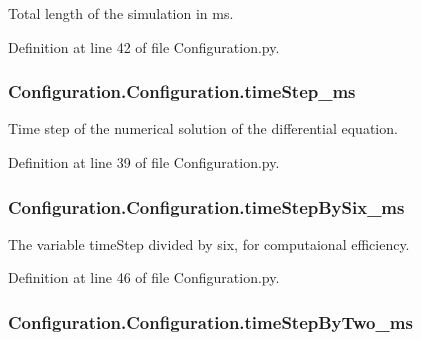 Total length of the simulation in ms. 



Definition at line 42 of file Configuration.\-py.

\hypertarget{class_configuration_1_1_configuration_a6379aaa6e54523ca81e3713d1846679b}{
\subsubsection[{time\-Step\-\_\-ms}]{\setlength{\rightskip}{0pt plus 5cm}Configuration.\-Configuration.\-time\-Step\-\_\-ms}}\label{class_configuration_1_1_configuration_a6379aaa6e54523ca81e3713d1846679b}


Time step of the numerical solution of the differential equation. 



Definition at line 39 of file Configuration.\-py.

\hypertarget{class_configuration_1_1_configuration_aa49387a016f5d528136ab5812821cb99}{
\subsubsection[{time\-Step\-By\-Six\-\_\-ms}]{\setlength{\rightskip}{0pt plus 5cm}Configuration.\-Configuration.\-time\-Step\-By\-Six\-\_\-ms}}\label{class_configuration_1_1_configuration_aa49387a016f5d528136ab5812821cb99}


The variable time\-Step divided by six, for computaional efficiency. 



Definition at line 46 of file Configuration.\-py.

\hypertarget{class_configuration_1_1_configuration_a58f6e3bf5491f8fb229697fc3690aa12}{
\subsubsection[{time\-Step\-By\-Two\-\_\-ms}]{\setlength{\rightskip}{0pt plus 5cm}Configuration.\-Configuration.\-time\-Step\-By\-Two\-\_\-ms}}\label{class_configuration_1_1_configuration_a58f6e3bf5491f8fb229697fc3690aa12}



